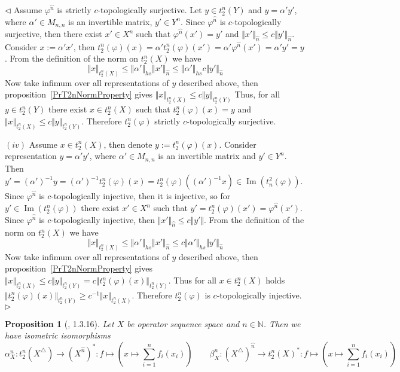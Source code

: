 \documentclass[12pt]{article}
\newtheorem{proposition}[theorem]{Proposition}
\newenvironment{proof}{\par $\triangleleft$}{$\triangleright$}
\begin{document}
\begin{proof}
Assume $\varphi^{\wideparen{n}}$ is strictly $c$-topologically surjective. 
Let $y\in t_2^n(Y)$ and $y=\alpha' y'$, where $\alpha'\in M_{n,n}$ is an 
invertible matrix, $y'\in Y^n$. Since $\varphi^{\wideparen{n}}$ is  
$c$-topologically surjective, then there exist $x'\in X^n$ such that 
$\varphi^{\wideparen{n}}(x')=y'$ and 
$\Vert x'\Vert_{\wideparen{n}}\leq c\Vert y'\Vert_{\wideparen{n}}$. Consider 
$x:=\alpha'x'$, then 
$t_2^n(\varphi)(x)=\alpha't_2^n(\varphi)(x')
=\alpha'\varphi^{\wideparen{n}}(x')=\alpha' y'=y$. From the definition of the 
norm on $t_2^n(X)$ we have
$$
\Vert x\Vert_{t_2^n(X)} \leq\Vert\alpha'\Vert_{hs}\Vert x'\Vert_{\wideparen{n}}
\leq\Vert\alpha'\Vert_{hs} c\Vert y'\Vert_{\wideparen{n}}
$$
Now take infimum over all representations of $y$ described above, then 
proposition~\ref{PrT2nNormProperty} gives 
$\Vert x\Vert_{t_2^n(X)}\leq c\Vert y\Vert_{t_2^n(Y)}$
Thus, for all $y\in t_2^n(Y)$ there exist $x\in t_2^n(X)$ such that 
$t_2^n(\varphi)(x)=y$ and 
$\Vert x\Vert_{t_2^n(X)}\leq c\Vert y\Vert_{t_2^n(Y)}$. Therefore 
$t_2^n(\varphi)$ strictly $c$-topologically surjective.

$(iv)$ Assume $x\in t_2^n(X)$, then denote $y:=t_2^n(\varphi)(x)$. Consider 
representation $y=\alpha' y'$, where $\alpha'\in M_{n,n}$ is an invertible 
matrix and $y'\in Y^n$. Then 
$y'={(\alpha')}^{-1}y={(\alpha')}^{-1}t_2^n(\varphi)(x)
=t_2^n(\varphi)({(\alpha')}^{-1}x)\in\operatorname{Im}(t_n^2(\varphi))$. Since
$\varphi^{\wideparen{n}}$ is $c$-topologically injective, then it is injective, 
so for $y'\in \operatorname{Im}(t_2^n(\varphi))$ there exist $x'\in X^n$ such 
that $y'=t_2^n(\varphi)(x')=\varphi^{\wideparen{n}}(x')$. Since 
$\varphi^{\wideparen{n}}$ is $c$-topologically injective, then 
$\Vert x'\Vert_{\wideparen{n}}\leq c\Vert y'\Vert$. From the definition of the 
norm on $t_2^n(X)$ we have
$$
\Vert x\Vert_{t_2^n(X)}\leq\Vert\alpha'\Vert_{hs}\Vert
x'\Vert_{\wideparen{n}}\leq c\Vert\alpha'\Vert_{hs}\Vert y'\Vert_{\wideparen{n}}
$$
Now take infimum over all representations of $y$ described above, then 
proposition~\ref{PrT2nNormProperty} gives 
$\Vert x\Vert_{t_2^n(X)}\leq c
\Vert y\Vert_{t_2^n(Y)}=c\Vert t_2^n(\varphi)(x)\Vert_{t_2^n(Y)}$. 
Thus for all $x\in t_2^n(X)$ holds 
$\Vert t_2^n(\varphi)(x)\Vert_{t_2^n(Y)}\geq c^{-1}\Vert x\Vert_{t_2^n(X)}$. 
Therefore $t_2^n(\varphi)$ is $c$-topologically injective.
\end{proof}

\begin{proposition}[\cite{LamOpFolgen}, 1.3.16]\label{PrT2nTraingDuality}
Let $X$ be operator sequence space and $n\in\mathbb{N}$. Then we have isometric 
isomorphisms
$$
\alpha_X^n:t_2^n(X^\triangle)\to {(X^{\wideparen{n}})}^*:
f\mapsto\left(x\mapsto\sum\limits_{i=1}^n f_i(x_i)\right)
\qquad
\beta_X^n
:{(X^\triangle)}^{\wideparen{n}}\to {t_2^n(X)}^*
:f\mapsto\left(x\mapsto\sum\limits_{i=1}^n f_i(x_i)\right)
$$
\end{proposition}
\end{document}
